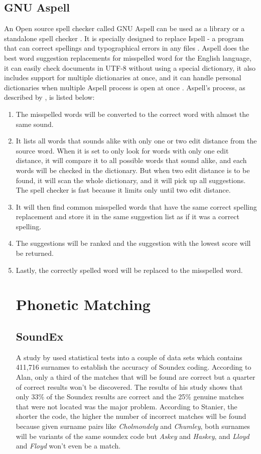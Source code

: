 \documentclass[12pt]{book}
\begin{document}
\subsection{GNU Aspell}
An Open source spell checker called GNU Aspell can be used as a library or a standalone spell checker \cite{atkinson2016}. It is specially designed to replace Ispell - a program that can correct spellings and typographical errors in any files \cite{ispell}.  Aspell does the best word suggestion replacements for misspelled word for the English language, it can easily check documents in UTF-8 without using a special dictionary, it also includes support for multiple dictionaries at once, and it can handle personal dictionaries when multiple Aspell process is open at once \cite{atkinson2016}. Aspell’s process, as described by \cite{atkinson2004}, is listed below:
\begin{enumerate}
	\item The misspelled words will be converted to the correct word with almost the same sound.
	\item It lists all words that sounds alike with only one or two edit distance from the source word. When it is set to only look for words with only one edit distance, it will compare it to all possible words that sound alike, and each words will be checked in the dictionary. But when two edit distance is to be found, it will scan the whole dictionary, and it will pick up all suggestions. The spell checker is fast because it limits only until two edit distance.
	\item It will then find common misspelled words that have the same correct spelling replacement and store it in the same suggestion list as if it was a correct spelling.
	\item The suggestions will be ranked and the suggestion with the lowest score will be returned.
	\item Lastly, the correctly spelled word will be replaced to the misspelled word.

\section{Phonetic Matching}	
\subsection{SoundEx}
A study by \cite{stanier1990accurate} used statistical tests into a couple of data sets which contains 411,716 surnames to establish the accuracy of Soundex coding. According to Alan, only a third of the matches that will be found are correct but a quarter of correct results won't be discovered. The results of his study shows that only 33\% of the Soundex results are correct and the 25\% genuine matches that were not located was the major problem. According to Stanier, the shorter the code, the higher the number of incorrect matches will be found because given surname pairs like \textit{Cholmondely} and \textit{Chumley}, both surnames will be variants of the same soundex code but \textit{Askey} and \textit{Haskey}, and \textit{Lloyd} and \textit{Floyd} won't even be a match.


\end{enumerate}
\end{document}
